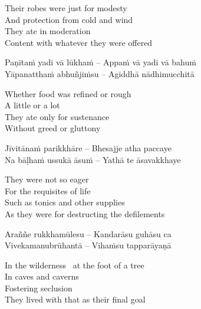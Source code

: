 \begin{english-verses}
  Their robes were just for modesty\\
  And protection from cold and wind\\
  They ate in moderation\\
  Content with whatever they were offered
\end{english-verses}

\begin{twochants}
  Paṇītaṁ yadi vā lūkhaṁ – Appaṁ vā yadi vā bahuṁ\\
  Yāpanatthaṁ abhuñjiṁsu – Agiddhā nādhimucchitā\\
\end{twochants}

\begin{english-verses}
  Whether food was refined or rough\\
  A little or a lot\\
  They ate only for sustenance\\
  Without greed or gluttony
\end{english-verses}

\begin{twochants}
  Jīvitānaṁ parikkhāre – Bhesajje atha paccaye\\
  Na bāḷhaṁ ussukā āsuṁ – Yathā te āsavakkhaye\\
\end{twochants}

\begin{english-verses}
  They were not so eager\\
  For the requisites of life\\
  Such as tonics and other supplies\\
  As they were for destructing the defilements
\end{english-verses}

\begin{twochants}
  Araññe rukkhamūlesu – Kandarāsu guhāsu ca\\
  Vivekamanubrūhantā – Vihaṁsu tapparāyaṇā\\
\end{twochants}

\begin{english-verses}
  In the wilderness \breathmark\ at the foot of a tree\\
  In caves and caverns\\
  Fostering seclusion\\
  They lived with that as their final goal
\end{english-verses}

